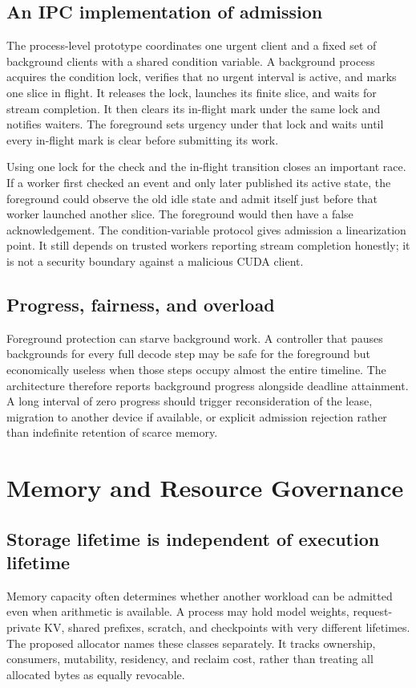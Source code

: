 \subsection{An IPC implementation of admission}
The process-level prototype coordinates one urgent client and a fixed set
of background clients with a shared condition variable. A background process
acquires the condition lock, verifies that no urgent interval is active, and
marks one slice in flight. It releases the lock, launches its finite slice,
and waits for stream completion. It then clears its in-flight mark under
the same lock and notifies waiters. The foreground sets urgency under that
lock and waits until every in-flight mark is clear before submitting its work.

Using one lock for the check and the in-flight transition closes an important
race. If a worker first checked an event and only later published its active
state, the foreground could observe the old idle state and admit itself just
before that worker launched another slice. The foreground would then have a
false acknowledgement. The condition-variable protocol gives admission a
linearization point. It still depends on trusted workers reporting stream
completion honestly; it is not a security boundary against a malicious CUDA
client.

\subsection{Progress, fairness, and overload}
Foreground protection can starve background work. A controller that pauses
backgrounds for every full decode step may be safe for the foreground but
economically useless when those steps occupy almost the entire timeline.
The architecture therefore reports background progress alongside deadline
attainment. A long interval of zero progress should trigger reconsideration
of the lease, migration to another device if available, or explicit admission
rejection rather than indefinite retention of scarce memory.

\section{Memory and Resource Governance}
\label{sec:memory}
\subsection{Storage lifetime is independent of execution lifetime}
Memory capacity often determines whether another workload can be admitted
even when arithmetic is available. A process may hold model weights,
request-private KV, shared prefixes, scratch, and checkpoints with very
different lifetimes. The proposed allocator names these classes separately.
It tracks ownership, consumers, mutability, residency, and reclaim cost,
rather than treating all allocated bytes as equally revocable.

